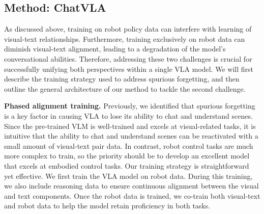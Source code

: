 
\subsection{Method: ChatVLA}
\label{sec:architecture_data}
As discussed above, training on robot policy data can interfere with learning of visual-text relationships.  Furthermore, training exclusively on robot data can diminish visual-text alignment, leading to a degradation of the model's conversational abilities. Therefore, addressing these two challenges is crucial for successfully unifying both perspectives within a single VLA model. We will first describe the training strategy used to address spurious forgetting, and then outline the general architecture of our method to tackle the second challenge.




\textbf{Phased alignment training.} Previously, we identified that spurious forgetting is a key factor in causing VLA to lose its ability to chat and understand scenes. Since the pre-trained VLM is well-trained and excels at visual-related tasks, it is intuitive that the ability to chat and understand scenes can be reactivated with a small amount of visual-text pair data. In contrast, robot control tasks are much more complex to train, so the priority should be to develop an excellent model that excels at embodied control tasks. Our training strategy is straightforward yet effective. We first train the VLA model on robot data. During this training, we also include reasoning data to ensure continuous alignment between the visual and text components. Once the robot data is trained, we co-train both visual-text and robot data to help the model retain proficiency in both tasks.



